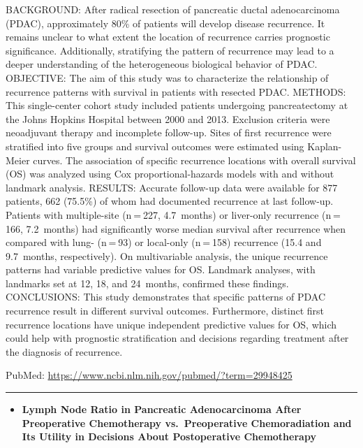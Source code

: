 \documentclass[]{article}
\providecommand{\tightlist}{%
  \setlength{\itemsep}{0pt}\setlength{\parskip}{0pt}}
\begin{document}
BACKGROUND: After radical resection of pancreatic ductal adenocarcinoma
(PDAC), approximately 80\% of patients will develop disease recurrence.
It remains unclear to what extent the location of recurrence carries
prognostic significance. Additionally, stratifying the pattern of
recurrence may lead to a deeper understanding of the heterogeneous
biological behavior of PDAC. OBJECTIVE: The aim of this study was to
characterize the relationship of recurrence patterns with survival in
patients with resected PDAC. METHODS: This single-center cohort study
included patients undergoing pancreatectomy at the Johns Hopkins
Hospital between 2000 and 2013. Exclusion criteria were neoadjuvant
therapy and incomplete follow-up. Sites of first recurrence were
stratified into five groups and survival outcomes were estimated using
Kaplan-Meier curves. The association of specific recurrence locations
with overall survival (OS) was analyzed using Cox proportional-hazards
models with and without landmark analysis. RESULTS: Accurate follow-up
data were available for 877 patients, 662 (75.5\%) of whom had
documented recurrence at last follow-up. Patients with multiple-site
(n = 227, 4.7~months) or liver-only recurrence (n = 166, 7.2~months) had
significantly worse median survival after recurrence when compared with
lung- (n = 93) or local-only (n = 158) recurrence (15.4 and 9.7~months,
respectively). On multivariable analysis, the unique recurrence patterns
had variable predictive values for OS. Landmark analyses, with landmarks
set at 12, 18, and 24~months, confirmed these findings. CONCLUSIONS:
This study demonstrates that specific patterns of PDAC recurrence result
in different survival outcomes. Furthermore, distinct first recurrence
locations have unique independent predictive values for OS, which could
help with prognostic stratification and decisions regarding treatment
after the diagnosis of recurrence.

PubMed: \url{https://www.ncbi.nlm.nih.gov/pubmed/?term=29948425}

{}

{}

\begin{center}\rule{0.5\linewidth}{\linethickness}\end{center}

\begin{itemize}
\tightlist
\item
  \textbf{Lymph Node Ratio in Pancreatic Adenocarcinoma After
  Preoperative Chemotherapy vs.~Preoperative Chemoradiation and Its
  Utility in Decisions About Postoperative Chemotherapy}
\end{itemize}
\end{document}
